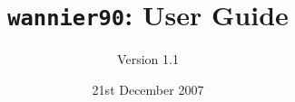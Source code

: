 \documentclass[a4paper,11pt,twoside]{book}
\title{{\tt wannier90}: User Guide}
\author{Version 1.1}
\date{21st December 2007}
\begin{document}
\newcommand{\wannier}{\texttt{wannier90}}
\newcommand{\pwscf}{\textsc{pwscf}}
\newcommand{\QE}{\textsc{quantum-espresso}}
\newcommand{\Mkb}{\mathbf{M}^{(\mathbf{k},\mathbf{b})}}
\newcommand{\Ak}{\mathbf{A}^{(\mathbf{k})}}
\newcommand{\Uk}{\mathbf{U}^{(\mathbf{k})}}
\newcommand{\cond}{\item[$\star$]}
\newcommand{\omi}{\Omega_{\mathrm{I}}}
\newcommand{\omt}{\widetilde{\Omega}}


\maketitle
























%
\end{document}
